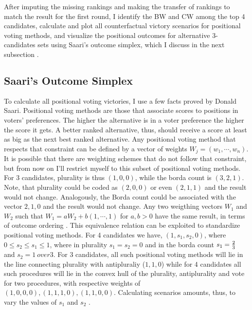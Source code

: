 \documentclass[hidelinks,11pt]{article} \usepackage[utf8]{inputenc}
\begin{document}
After imputing the missing rankings and making the transfer of rankings to match
the result for the first round, I identify the BW and CW among the top 4
candidates, calculate and plot all counterfactual victory scenarios for
positional voting methods, and visualize the positional outcomes for alternative
3-candidates sets using Saari's outcome simplex, which I discuss in the next subsection \parencite{saari1995basic}.


\subsection{Saari's Outcome Simplex}

To calculate all positional voting victories, I use a few facts proved by Donald
Saari. Positional voting methods are those that associate scores to
positions in voters' preferences. The higher the alternative is in a voter
preference the higher the score it gets. A better ranked alternative, thus,
should receive a score at least as big as the next best ranked alternative. Any
positional voting method that respects that constraint can be defined by a
vector of weights \(W_{j} = (w_{1}, \cdots, w_{n})\). It is possible that there are weighting schemes that do not follow that constraint, but from now on I'll restrict myself to this subset of positional voting methods. For 3 candidates, plurality is thus \((1,0,0)\), while the borda count is \((3,2,1)\). Note, that plurality could be coded as \((2,0,0)\) or even \((2,1,1)\) and the result would not change. Analogously, the Borda count could be associated with the vector \(2,1,0\) and the result would not change. Any two weigthing vectors \(W_{1}\) and \(W_{2}\) such that \(W_{1} = aW_{2} + b(1,\cdots, 1)\) for \(a,b > 0\) have the same result, in terms of outcome ordering \parencite{saari1995basic}. This equivalence relation can be exploited to standardize positional voting methods. For 4 candidates we have, \((1,s_{1},s_{2},0)\), where
\(0 \leq s_{2} \leq s_{1} \leq 1\), where in plurality \(s_{1} = s_{2} = 0\) and in the borda count \(s_{1} = {2 \over 3}\) and \(s_{2} = {1 \ over 3}\). For  3 candidates, all such positional voting methods will lie in the line connecting plurality with antipluraliy (\(1,1,0\)) while for 4 candidates  all such procedures will lie in the
convex hull of the plurality, antiplurality and vote for two procedures, with
respective weights of \((1,0,0,0), (1,1,1,0), (1,1,0,0)\). Calculating scenarios
amounts, thus, to vary the values of \(s_{1}\) and \(s_{2}\) \parencite{saari1995basic, saari2001chaotic}.
\end{document}
